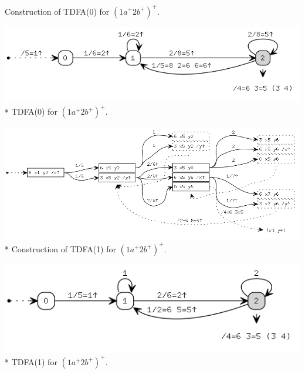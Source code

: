 \documentclass{article}
\theoremstyle{definition}
\begin{document}
\begin{multicols}{2}
\begin{center}
\footnotesize{Construction of TDFA(0) for $(1 a^+ 2 b^+)^+$.} \\
\end{center}
\begin{center}
\includegraphics[width=\linewidth]{img/example5/tdfa0.png}\\*
\footnotesize{TDFA(0) for $(1 a^+ 2 b^+)^+$.} \\
\end{center}
\begin{center}
\includegraphics[width=\linewidth]{img/example5/tdfa1_raw.png}\\*
\footnotesize{Construction of TDFA(1) for $(1 a^+ 2 b^+)^+$.} \\
\end{center}
\begin{center}
\includegraphics[width=0.8\linewidth]{img/example5/tdfa1.png}\\*
\footnotesize{TDFA(1) for $(1 a^+ 2 b^+)^+$.} \\
\end{center}


\end{multicols}
\end{document}
